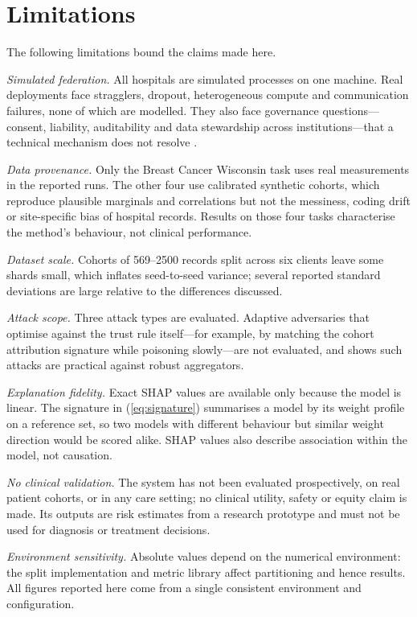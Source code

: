 \documentclass[conference]{IEEEtran}
\begin{document}
\section{Limitations}
\label{sec:limits}

The following limitations bound the claims made here.

\emph{Simulated federation.} All hospitals are simulated processes on one
machine. Real deployments face stragglers, dropout, heterogeneous compute and
communication failures, none of which are modelled. They also face governance
questions---consent, liability, auditability and data stewardship across
institutions---that a technical mechanism does not resolve
\cite{eden2025governance}.

\emph{Data provenance.} Only the Breast Cancer Wisconsin task uses real
measurements in the reported runs. The other four use calibrated synthetic
cohorts, which reproduce plausible marginals and correlations but not the
messiness, coding drift or site-specific bias of hospital records. Results on
those four tasks characterise the method's behaviour, not clinical
performance.

\emph{Dataset scale.} Cohorts of 569--2500 records split across six clients
leave some shards small, which inflates seed-to-seed variance; several
reported standard deviations are large relative to the differences discussed.

\emph{Attack scope.} Three attack types are evaluated. Adaptive adversaries
that optimise against the trust rule itself---for example, by matching the
cohort attribution signature while poisoning slowly---are not evaluated, and
 shows such attacks are practical against robust aggregators.

\emph{Explanation fidelity.} Exact SHAP values are available only because
the model is linear. The signature in (\ref{eq:signature}) summarises a model
by its weight profile on a reference set, so two models with different
behaviour but similar weight direction would be scored alike. SHAP values
also describe association within the model, not causation.

\emph{No clinical validation.} The system has not been evaluated
prospectively, on real patient cohorts, or in any care setting; no clinical
utility, safety or equity claim is made. Its outputs are risk estimates from
a research prototype and must not be used for diagnosis or treatment
decisions.

\emph{Environment sensitivity.} Absolute values depend on the numerical
environment: the split implementation and metric library affect partitioning
and hence results. All figures reported here come from a single consistent
environment and configuration.
\end{document}
